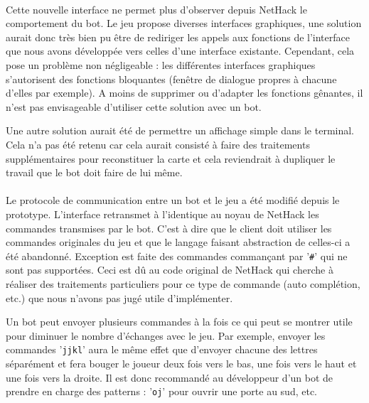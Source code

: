 \documentclass[a4paper,12pt]{article}
\begin{document}
\paragraph{} Cette nouvelle interface ne permet plus d'observer depuis NetHack le comportement du bot. Le jeu propose diverses interfaces graphiques, une solution aurait donc très bien pu être de rediriger les appels aux fonctions de l'interface que nous avons développée vers celles d'une interface existante. Cependant, cela pose un problème non négligeable : les différentes interfaces graphiques s'autorisent des fonctions bloquantes (fenêtre de dialogue propres à chacune d'elles par exemple). A moins de supprimer ou d'adapter les fonctions gênantes, il n'est pas envisageable d'utiliser cette solution avec un bot.

Une autre solution aurait été de permettre un affichage simple dans le terminal. Cela n'a pas été retenu car cela aurait consisté à faire des traitements supplémentaires pour reconstituer la carte et cela reviendrait à dupliquer le travail que le bot doit faire de lui même.

\paragraph{} Le protocole de communication entre un bot et le jeu a été modifié depuis le prototype. L'interface retransmet à l'identique au noyau de NetHack les commandes transmises par le bot. C'est à dire que le client doit utiliser les commandes originales du jeu et que le langage faisant abstraction de celles-ci a été abandonné. Exception est faite des commandes commançant par '\verb!#!' qui ne sont pas supportées. Ceci est dû au code original de NetHack qui cherche à réaliser des traitements particuliers pour ce type de commande (auto complétion, etc.) que nous n'avons pas jugé utile d'implémenter.

Un bot peut envoyer plusieurs commandes à la fois ce qui peut se montrer utile pour diminuer le nombre d'échanges avec le jeu. Par exemple, envoyer les commandes '\verb!jjkl!' aura le même effet que d'envoyer chacune des lettres séparément et fera bouger le joueur deux fois vers le bas, une fois vers le haut et une fois vers la droite. Il est donc recommandé au développeur d'un bot de prendre en charge des patterns : '\verb!oj!' pour ouvrir une porte au sud, etc.
\end{document}
